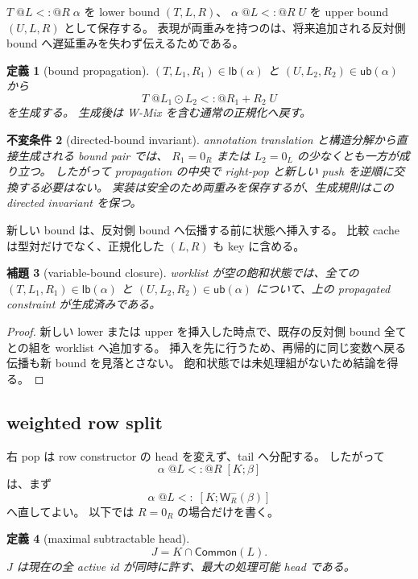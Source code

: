 \documentclass[uplatex,dvipdfmx,a4paper,10.5pt]{jsarticle}
\makeatletter
\theoremstyle{jpplain}
\newtheorem{definition}{定義}[section]
\newtheorem{lemma}[definition]{補題}
\newtheorem{invariant}[definition]{不変条件}
\newcommand{\lb}{\mathsf{lb}}
\newcommand{\ub}{\mathsf{ub}}
\newcommand{\Common}{\mathsf{Common}}
\newcommand{\NWeight}[2]{\mathsf{W}^{-}_{#1}(#2)}
\newcommand{\row}[2]{[#1;#2]}
\newcommand{\wsub}[4]{#1\;@#2\mathrel{<:}@#3\;#4}
\newcommand{\lsub}[3]{#1\;@#2\mathrel{<:}\;#3}
\makeatother
\begin{document}
$\wsub{T}{L}{R}{\alpha}$ を lower bound $(T,L,R)$、
$\wsub{\alpha}{L}{R}{U}$ を upper bound $(U,L,R)$ として保存する。
表現が両重みを持つのは、将来追加される反対側 bound へ遅延重みを失わず伝えるためである。

\begin{definition}[bound propagation]
$(T,L_1,R_1)\in\lb(\alpha)$ と
$(U,L_2,R_2)\in\ub(\alpha)$ から
\[
  \wsub{T}{L_1\odot L_2}{R_1+R_2}{U}
\]
を生成する。
生成後は W-Mix を含む通常の正規化へ戻す。
\end{definition}

\begin{invariant}[directed-bound invariant]
annotation translation と構造分解から直接生成される bound pair では、
$R_1=0_R$ または $L_2=0_L$ の少なくとも一方が成り立つ。
したがって propagation の中央で right-pop と新しい push を逆順に交換する必要はない。
実装は安全のため両重みを保存するが、生成規則はこの directed invariant を保つ。
\end{invariant}

新しい bound は、反対側 bound へ伝播する前に状態へ挿入する。
比較 cache は型対だけでなく、正規化した $(L,R)$ も key に含める。

\begin{lemma}[variable-bound closure]
worklist が空の飽和状態では、全ての
$(T,L_1,R_1)\in\lb(\alpha)$ と
$(U,L_2,R_2)\in\ub(\alpha)$ について、上の propagated constraint が生成済みである。
\end{lemma}

\begin{proof}
新しい lower または upper を挿入した時点で、既存の反対側 bound 全てとの組を worklist へ追加する。
挿入を先に行うため、再帰的に同じ変数へ戻る伝播も新 bound を見落とさない。
飽和状態では未処理組がないため結論を得る。
\end{proof}

\subsection{weighted row split}\label{sec:row-split}

右 pop は row constructor の head を変えず、tail へ分配する。
したがって
\[
  \wsub{\alpha}{L}{R}{\row{K}{\beta}}
\]
は、まず
\[
  \lsub{\alpha}{L}{\row{K}{\NWeight{R}{\beta}}}
\]
へ直してよい。
以下では $R=0_R$ の場合だけを書く。

\begin{definition}[maximal subtractable head]
\[
  J=K\cap\Common(L).
\]
$J$ は現在の全 active id が同時に許す、最大の処理可能 head である。
\end{definition}
\end{document}
